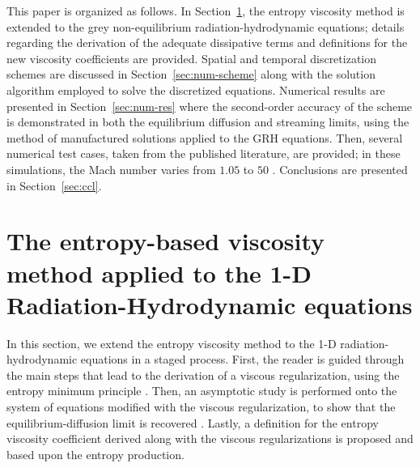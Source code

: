 \documentclass[review]{elsarticle}
\newcommand{\sect}[1]{Section~\ref{#1}}                     %
\begin{document}
This paper is organized as follows. In \sect{sec:entropy-visc-meth}, the entropy viscosity method is extended to the grey non-equilibrium radiation-hydrodynamic equations;  details regarding the derivation of the adequate dissipative terms and definitions for the new viscosity coefficients are provided. Spatial and temporal discretization schemes are discussed in \sect{sec:num-scheme} along with the solution algorithm employed to solve the discretized equations. Numerical results are presented in \sect{sec:num-res} where the second-order accuracy of the scheme is demonstrated in both the equilibrium diffusion and streaming limits, using the method of manufactured solutions applied to the GRH equations. Then, several numerical test cases, taken from the published literature, are provided; in these simulations, the Mach number varies from $1.05$ to $50$ \cite{LowrieEdwards}. Conclusions are presented in \sect{sec:ccl}.

\section{The entropy-based viscosity method applied to the 1-D Radiation-Hydrodynamic equations}
\label{sec:entropy-visc-meth}

In this section, we extend the entropy viscosity method \cite{jlg1, jlg2, valentin} to the 1-D radiation-hydrodynamic equations in a staged process. First, the reader is guided through the main steps that lead to the derivation of a viscous regularization, using the entropy minimum principle \cite{entropy}. Then, an asymptotic study is performed onto the system of equations modified with the viscous regularization, to show that the equilibrium-diffusion limit is recovered \cite{LowrieMorel}. Lastly, a definition for the entropy viscosity coefficient derived along with the viscous regularizations is proposed and based upon the entropy production.  
\end{document}
